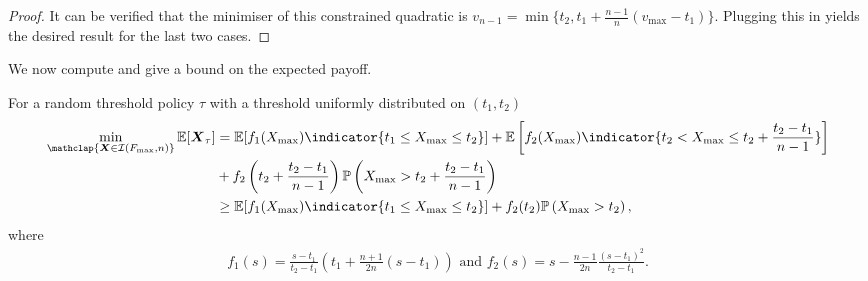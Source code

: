 \documentclass[11pt,a4paper]{article}
\numberwithin{equation}{section}
\begin{document}
\begin{proof}
    It can be verified that the minimiser of this constrained quadratic is $v_{n-1}=\min\{t_2,t_1+\frac{n-1}{n}(v_{\max}-t_1)\}$. Plugging this in yields the desired result for the last two cases.
\end{proof}
We now compute and give a bound on the expected payoff.

\begin{lemma}
    \label{lemma:expected-payoff-uniform-point-policy}
    For a random threshold policy $\tau$ with a threshold uniformly distributed on $(t_1, t_2)$
    \begin{align*}
        \min_{\mathclap{\boldsymbol{X}\in\mathcal{I}(F_{\max},n)}}\mathbb{E}[\boldsymbol{X}_{\tau}]
        &=\mathbb{E}[f_1(X_{\max})\indicator{t_1 \le X_{\max}\le t_2}]+\mathbb{E}\left[f_2(X_{\max})\indicator{t_2 < X_{\max}\le t_2+\frac{t_2-t_1}{n-1}}\right]\\
        &+f_2\left(t_2+\frac{t_2-t_1}{n-1}\right)\mathbb{P}\left(X_{\max}> t_2+\frac{t_2-t_1}{n-1}\right)\\
        &\ge\mathbb{E}[f_1(X_{\max})\indicator{t_1 \le X_{\max}\le t_2}]+f_2(t_2)\mathbb{P}\left(X_{\max}>t_2\right),
    \end{align*}
    where
    \begin{align*}
        f_1(s)=\frac{s-t_1}{t_2-t_1}\left(t_1+\frac{n+1}{2n}(s-t_1)\right)\text{ and }
        f_2(s)=s-\frac{n-1}{2n}\frac{(s-t_1)^2}{t_2-t_1}.
    \end{align*}
\end{lemma}
\end{document}
